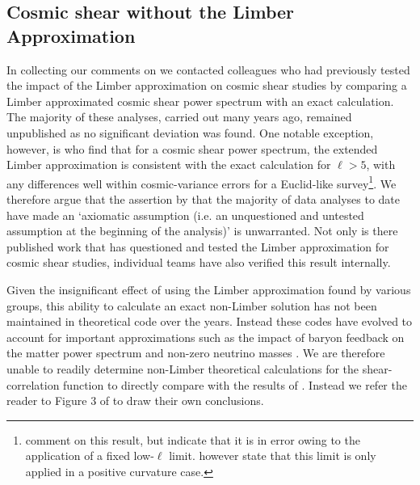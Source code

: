  \subsection{Cosmic shear without the Limber Approximation}
In collecting our comments on \citet{kitching/etal:2016} we contacted colleagues who had previously tested the impact of the Limber approximation on cosmic shear studies by comparing a Limber approximated cosmic shear power spectrum with an exact calculation.  The majority of these analyses, carried out many years ago, remained unpublished as no significant deviation was found.  One notable exception, however, is \citet{giannantonio/etal:2012} who find that for a cosmic shear power spectrum, the extended Limber approximation is consistent with the exact calculation for $\ell>5$, with any differences well within cosmic-variance errors for a Euclid-like survey\footnote{\citet{kitching/etal:2016} comment on this result, but indicate that it is in error owing to the application of a fixed low-$\ell$ limit.  \citet{giannantonio/etal:2012} however state that this limit is only applied in a positive curvature case.}.  We therefore argue that the assertion by \citet{kitching/etal:2016} that the majority of data analyses to date have made an `axiomatic assumption (i.e. an unquestioned and untested assumption at the beginning of the analysis)'  is unwarranted.  Not only is there published work that has questioned and tested the Limber approximation for cosmic shear studies, individual teams have also verified this result internally.    

Given the insignificant effect of using the Limber approximation found by various groups, this ability to calculate an exact non-Limber solution has not been maintained in theoretical code over the years.  Instead these codes have evolved to account for important approximations such as the impact of baryon feedback on the matter power spectrum and non-zero neutrino masses \citep[see for example][]{joudaki/etal:2016, mead/etal:2016}.    We are therefore unable to readily determine non-Limber theoretical calculations for the shear-correlation function to directly compare with the results of \citet{kitching/etal:2016}.   Instead we refer the reader to Figure 3 of \citet{giannantonio/etal:2012} to draw their own conclusions.



 
 
 
 
 
 
 